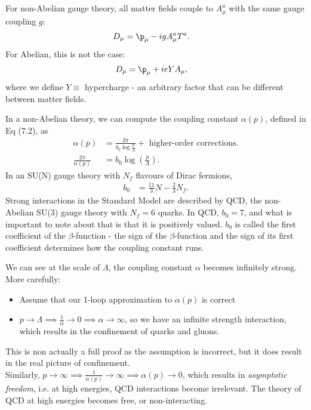 \documentclass[relqm.tex]{subfiles}
\begin{document}
\chapter{}
For non-Abelian gauge theory, all matter fields couple to $A_\mu^a$ with the same gauge coupling $g$:
\begin{align}
    D_\mu &= \p_\mu - igA_\mu^aT^a.
\end{align}
For Abelian, this is not the case:
\begin{align}
    D_\mu &= \p_\mu + ieYA_\mu,
\end{align}
where we define $Y\equiv$ hypercharge - an arbitrary factor that can be different between matter fields.

In a non-Abelian theory, we can compute the coupling constant $\alpha(p)$, defined in Eq (7.2), as
\begin{align}
    \alpha(p) &= \frac{2\pi}{b_0\log\frac{p}{\Lambda}} + \text{ higher-order corrections.} \\
    \frac{2\pi}{\alpha(p)} &= b_0\log\left(\frac{p}{\Lambda}\right).
\end{align}
In an SU(N) gauge theory with $N_f$ flavours of Dirac fermions,
\begin{align}
    b_0 &= \frac{11}{3}N - \frac23 N_f.
\end{align}
Strong interactions in the Standard Model are described by QCD, the non-Abelian SU(3) gauge theory with $N_f=6$ quarks. 
In QCD, $b_0=7$, and what is important to note about that is that it is positively valued. 
$b_0$ is called the first coefficient of the $\beta$-function - the sign of the $\beta$-function and the sign of its first coefficient determines how the coupling constant runs. 
\begin{figure}[H]
    \centering
\end{figure}
We can see at the scale of $\Lambda$, the coupling constant $\alpha$ becomes infinitely strong. 
More carefully:
\begin{itemize}
    \item Assume that our 1-loop approximation to $\alpha(p)$ is correct
    \item $p\to\Lambda \implies \frac{1}{\alpha}\to 0\implies\alpha\to\infty$, so we have an infinite strength interaction, which results in the confinement of quarks and gluons. 
\end{itemize}
This is non actually a full proof as the assumption is incorrect, but it does result in the real picture of confinement. \\
Similarly, $p\to\infty\implies\frac{1}{\alpha(p)}\to\infty\implies\alpha(p)\to0$, which results in \emph{asymptotic freedom}, i.e. at high energies, QCD interactions become irrelevant. 
The theory of QCD at high energies becomes free, or non-interacting. 
\end{document}
